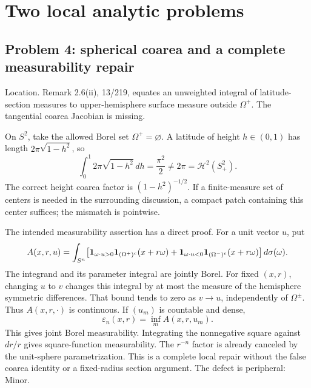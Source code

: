 \documentclass[10pt]{article}
\begin{document}
\section*{Two local analytic problems}
\subsection*{Problem 4: spherical coarea and a complete measurability repair}
Location. Remark 2.6(ii), 13/219, equates an unweighted integral of latitude-section measures to upper-hemisphere surface measure outside \(\Omega^+\). The tangential coarea Jacobian is missing.\par
On \(S^2\), take the allowed Borel set \(\Omega^+=\varnothing\). A latitude of height \(h\in(0,1)\) has length \(2\pi\sqrt{1-h^2}\), so \[\int_0^1 2\pi\sqrt{1-h^2}\,dh=\frac{\pi^2}{2}
 \ne2\pi=\mathcal H^2(S^2_+).\] The correct height coarea factor is \((1-h^2)^{-1/2}\). If a finite-measure set of centers is needed in the surrounding discussion, a compact patch containing this center suffices; the mismatch is pointwise.\par
The intended measurability assertion has a direct proof. For a unit vector \(u\), put \[A(x,r,u)=\int_{S^n}\!
 \left[{\bf1}_{\omega\cdot u>0}{\bf1}_{(\Omega^+)^c}(x+r\omega)
 +{\bf1}_{\omega\cdot u<0}{\bf1}_{(\Omega^-)^c}(x+r\omega)\right]d\sigma(\omega).\] The integrand and its parameter integral are jointly Borel. For fixed \((x,r)\), changing \(u\) to \(v\) changes this integral by at most the measure of the hemisphere symmetric differences. That bound tends to zero as \(v\to u\), independently of \(\Omega^\pm\). Thus \(A(x,r,\cdot)\) is continuous. If \((u_m)\) is countable and dense, \[\varepsilon_n(x,r)=\inf_m A(x,r,u_m).\] This gives joint Borel measurability. Integrating the nonnegative square against \(dr/r\) gives square-function measurability. The \(r^{-n}\) factor is already canceled by the unit-sphere parametrization. This is a complete local repair without the false coarea identity or a fixed-radius section argument. The defect is peripheral: Minor.\par
\end{document}
